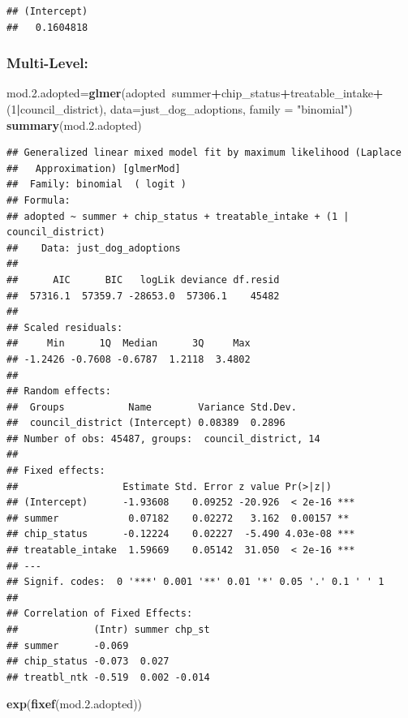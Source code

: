 \documentclass[]{article}
\newenvironment{Shaded}{\begin{snugshade}}{\end{snugshade}}
\newcommand{\KeywordTok}[1]{\textcolor[rgb]{0.13,0.29,0.53}{\textbf{#1}}}
\newcommand{\DataTypeTok}[1]{\textcolor[rgb]{0.13,0.29,0.53}{#1}}
\newcommand{\DecValTok}[1]{\textcolor[rgb]{0.00,0.00,0.81}{#1}}
\newcommand{\FloatTok}[1]{\textcolor[rgb]{0.00,0.00,0.81}{#1}}
\newcommand{\StringTok}[1]{\textcolor[rgb]{0.31,0.60,0.02}{#1}}
\newcommand{\OperatorTok}[1]{\textcolor[rgb]{0.81,0.36,0.00}{\textbf{#1}}}
\newcommand{\NormalTok}[1]{#1}
\begin{document}
\begin{verbatim}
## (Intercept) 
##   0.1604818
\end{verbatim}

\subsubsection{Multi-Level:}\label{multi-level}

\begin{Shaded}
\begin{Highlighting}[]
\NormalTok{mod.}\FloatTok{2.}\NormalTok{adopted=}\KeywordTok{glmer}\NormalTok{(adopted}\OperatorTok{~}\NormalTok{summer}\OperatorTok{+}\NormalTok{chip_status}\OperatorTok{+}\NormalTok{treatable_intake}\OperatorTok{+}\NormalTok{(}\DecValTok{1}\OperatorTok{|}\NormalTok{council_district), }\DataTypeTok{data=}\NormalTok{just_dog_adoptions, }\DataTypeTok{family =} \StringTok{"binomial"}\NormalTok{)}
\KeywordTok{summary}\NormalTok{(mod.}\FloatTok{2.}\NormalTok{adopted)}
\end{Highlighting}
\end{Shaded}

\begin{verbatim}
## Generalized linear mixed model fit by maximum likelihood (Laplace
##   Approximation) [glmerMod]
##  Family: binomial  ( logit )
## Formula: 
## adopted ~ summer + chip_status + treatable_intake + (1 | council_district)
##    Data: just_dog_adoptions
## 
##      AIC      BIC   logLik deviance df.resid 
##  57316.1  57359.7 -28653.0  57306.1    45482 
## 
## Scaled residuals: 
##     Min      1Q  Median      3Q     Max 
## -1.2426 -0.7608 -0.6787  1.2118  3.4802 
## 
## Random effects:
##  Groups           Name        Variance Std.Dev.
##  council_district (Intercept) 0.08389  0.2896  
## Number of obs: 45487, groups:  council_district, 14
## 
## Fixed effects:
##                  Estimate Std. Error z value Pr(>|z|)    
## (Intercept)      -1.93608    0.09252 -20.926  < 2e-16 ***
## summer            0.07182    0.02272   3.162  0.00157 ** 
## chip_status      -0.12224    0.02227  -5.490 4.03e-08 ***
## treatable_intake  1.59669    0.05142  31.050  < 2e-16 ***
## ---
## Signif. codes:  0 '***' 0.001 '**' 0.01 '*' 0.05 '.' 0.1 ' ' 1
## 
## Correlation of Fixed Effects:
##             (Intr) summer chp_st
## summer      -0.069              
## chip_status -0.073  0.027       
## treatbl_ntk -0.519  0.002 -0.014
\end{verbatim}

\begin{Shaded}
\begin{Highlighting}[]
\KeywordTok{exp}\NormalTok{(}\KeywordTok{fixef}\NormalTok{(mod.}\FloatTok{2.}\NormalTok{adopted))}
\end{Highlighting}
\end{Shaded}
\end{document}
